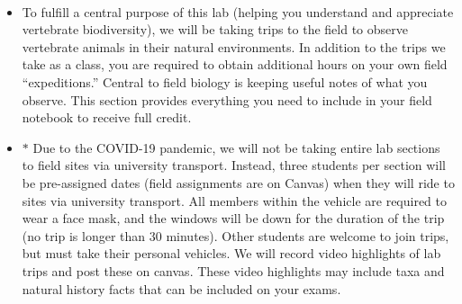 \documentclass[11pt, a4paper]{article}
\begin{document}
\pagestyle{fancyplain}
\fancyhf{}
\thispagestyle{plain}



\justify
{}\\ %
\begin{itemize}
\item{To fulfill a central purpose of this lab (helping you understand and appreciate vertebrate biodiversity), we will be taking trips to the field to observe vertebrate animals in their natural environments. In addition to the trips we take as a class, you are required to obtain additional hours on your own field ``expeditions.'' Central to field biology is keeping useful notes of what you observe. This section provides everything you need to include in your field notebook to receive full credit.}
\item{$*$ Due to the COVID-19 pandemic, we will not be taking entire lab sections to field sites via university transport. Instead, three students per section will be pre-assigned dates (field assignments are on Canvas) when they will ride to sites via university transport. All members within the vehicle are required to wear a face mask, and the windows will be down for the duration of the trip (no trip is longer than 30 minutes). Other students are welcome to join trips, but must take their personal vehicles. We will record video highlights of lab trips and post these on canvas. These video highlights may include taxa and natural history facts that can be included on your exams.}
\end{itemize}
\end{document}
